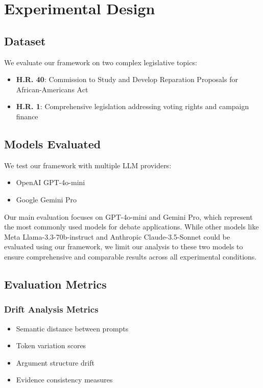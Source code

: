 \documentclass[11pt]{article}
\begin{document}
\section{Experimental Design}

\subsection{Dataset}

We evaluate our framework on two complex legislative topics:
\begin{itemize}
    \item \textbf{H.R. 40}: Commission to Study and Develop Reparation Proposals for African-Americans Act
    \item \textbf{H.R. 1}: Comprehensive legislation addressing voting rights and campaign finance
\end{itemize}

\subsection{Models Evaluated}

We test our framework with multiple LLM providers:
\begin{itemize}
    \item OpenAI GPT-4o-mini
    \item Google Gemini Pro
\end{itemize}

Our main evaluation focuses on GPT-4o-mini and Gemini Pro, which represent the most commonly used models for debate applications. While other models like Meta Llama-3.3-70b-instruct and Anthropic Claude-3.5-Sonnet could be evaluated using our framework, we limit our analysis to these two models to ensure comprehensive and comparable results across all experimental conditions.

\subsection{Evaluation Metrics}

\subsubsection{Drift Analysis Metrics}
\begin{itemize}
    \item Semantic distance between prompts
    \item Token variation scores
    \item Argument structure drift
    \item Evidence consistency measures
\end{itemize}
\end{document}
